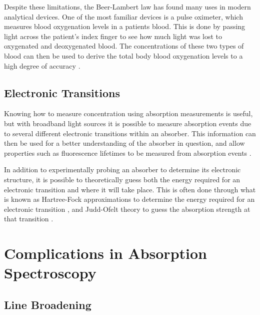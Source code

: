 Despite these limitations, the Beer-Lambert law has found many uses in modern
analytical devices. One of the most familiar devices is a pulse oximeter, which
measures blood oxygenation levels in a patients blood. This is done by passing
light across the patient's index finger to see how much light was lost to
oxygenated and deoxygenated blood. The concentrations of these two types of
blood can then be used to derive the total body blood oxygenation levels to a
high degree of accuracy \cite{Wukitsch:1987tb}.


\subsection{Electronic Transitions}\label{subsec:elec_trans}


Knowing how to measure concentration using absorption measurements is useful,
but with broadband light sources it is possible to measure absorption events
due to several different electronic transitions within an absorber. This
information can then be used for a better understanding of the absorber in
question, and allow properties such as fluorescence lifetimes to be measured
from absorption events \cite{Werts:2002fs}.

In addition to experimentally probing an absorber to determine its electronic structure, it is possible to theoretically guess both the energy required for an electronic transition and where it will take place. This is often done through what is known as Hartree-Fock approximations to determine the energy required for an electronic transition \cite{Szabo:1996tu}, and Judd-Ofelt theory to guess the absorption strength at that transition \cite{Judd:1962uq}.

\section{Complications in Absorption Spectroscopy}\label{sec:comp_abs}

\subsection{Line Broadening}\label{subsec:line_broad}

